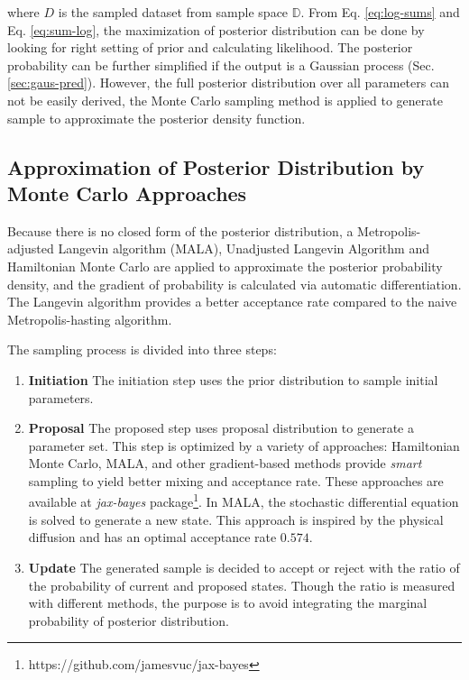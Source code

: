 \documentclass{article}
\begin{document}
where $D$ is the sampled dataset from sample space $\mathbb{D}$. From Eq. \ref{eq:log-sums} and Eq. \ref{eq:sum-log}, the maximization of posterior distribution can be done by looking for right setting of prior and calculating likelihood. The posterior probability can be further simplified if the output is a Gaussian process (Sec. \ref{sec:gaus-pred}). However, the full posterior distribution over all parameters can not be easily derived, the Monte Carlo sampling method is applied to generate sample to approximate the posterior density function. 

\subsection{Approximation of Posterior Distribution by Monte Carlo Approaches}

Because there is no closed form of the posterior distribution, a Metropolis-adjusted Langevin algorithm (MALA)\citep{roberts1998optimal}, Unadjusted Langevin Algorithm\citep{durmus2019high} and Hamiltonian Monte Carlo\citep{neal1996} are applied to approximate the posterior probability density, and the gradient of probability is calculated via automatic differentiation. The Langevin algorithm provides a better acceptance rate compared to the naive Metropolis-hasting algorithm\citep{roberts1998optimal}. 

The sampling process is divided into three steps:

\begin{enumerate}
    \item \textbf{Initiation} The initiation step uses the prior distribution to sample initial parameters.
    \item \textbf{Proposal} The proposed step uses proposal distribution to generate a  parameter set. This step is optimized by a variety of approaches\citep{jospin2022a}: Hamiltonian Monte Carlo\citep{neal1996, neal2011}, MALA, and other gradient-based methods provide \textit{smart} sampling to yield better mixing and acceptance rate. These approaches are available at \textit{jax-bayes} package\footnote{https://github.com/jamesvuc/jax-bayes}. In MALA, the stochastic differential equation is solved to generate a new state. This approach is inspired by the physical diffusion and has an optimal acceptance rate $0.574$\citep{roberts1998optimal}.
    \item \textbf{Update} The generated sample is decided to accept or reject with the ratio of the probability of current and proposed states. Though the ratio is measured with different methods, the purpose is to avoid integrating the marginal probability of posterior distribution.
\end{enumerate}
\end{document}

